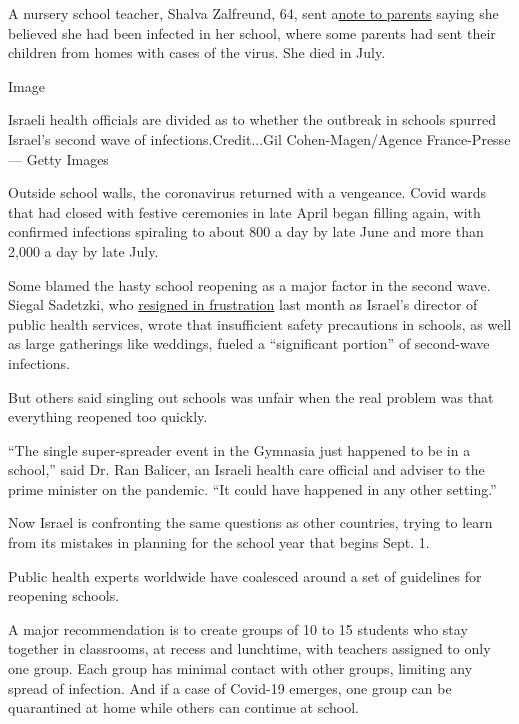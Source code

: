 A nursery school teacher, Shalva Zalfreund, 64, sent
a\href{https://www.facebookcorewwwi.onion/photo.php?fbid=2694147267485782\&set=a.1636227159944470\&type=3\&theater}{note
to parents} saying she believed she had been infected in her school,
where some parents had sent their children from homes with cases of the
virus. She died in July.

Image

Israeli health officials are divided as to whether the outbreak in
schools spurred Israel's second wave of infections.Credit...Gil
Cohen-Magen/Agence France-Presse --- Getty Images

Outside school walls, the coronavirus returned with a vengeance. Covid
wards that had closed with festive ceremonies in late April began
filling again, with confirmed infections spiraling to about 800 a day by
late June and more than 2,000 a day by late July.

Some blamed the hasty school reopening as a major factor in the second
wave. Siegal Sadetzki, who
\href{https://www.timesofisrael.com/top-health-ministry-official-quits-warns-israel-heading-down-dangerous-path/}{resigned
in frustration} last month as Israel's director of public health
services, wrote that insufficient safety precautions in schools, as well
as large gatherings like weddings, fueled a ``significant portion'' of
second-wave infections.

But others said singling out schools was unfair when the real problem
was that everything reopened too quickly.

``The single super-spreader event in the Gymnasia just happened to be in
a school,'' said Dr. Ran Balicer, an Israeli health care official and
adviser to the prime minister on the pandemic. ``It could have happened
in any other setting.''

Now Israel is confronting the same questions as other countries, trying
to learn from its mistakes in planning for the school year that begins
Sept. 1.

Public health experts worldwide have coalesced around a set of
guidelines for reopening schools.

A major recommendation is to create groups of 10 to 15 students who stay
together in classrooms, at recess and lunchtime, with teachers assigned
to only one group. Each group has minimal contact with other groups,
limiting any spread of infection. And if a case of Covid-19 emerges, one
group can be quarantined at home while others can continue at school.

